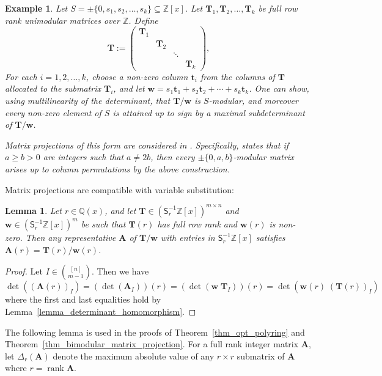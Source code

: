 \documentclass[a4paper, 11pt]{article}
\DeclareMathOperator{\rank}{rank}
\newcommand{\Z}{\mathbb{Z}}
\newcommand{\bA}{\bm{A}}
\newcommand{\bt}{\bm{t}}
\newcommand{\bw}{\bm{w}}
\newcommand{\bT}{\bm{T}}
\newcommand{\indet}{x}
\newcommand{\polyring}{\Z[\indet]}
\newcommand{\polyS}{S}
\newtheorem{lemma}{Lemma}
\newtheorem{example}{Example}
\begin{document}
\begin{example}\label{ex_trivially_S_modular}
Let $\polyS=\pm\{0,s_1,s_2,\ldots,s_k\}\subseteq\polyring$. Let $\bT_1,\bT_2,\ldots,\bT_k$ be full row rank unimodular matrices over $\Z$. Define
\[
\bT:=\left(\begin{array}{cccc}
\bT_1 &  &  &\\
 & \bT_2 & &\\
 & & \ddots &\\
 &  & & \bT_k
\end{array}\right),
\]
For each $i=1,2,\ldots,k$, choose a non-zero column $\bt_i$ from the columns of $\bT$ allocated to the submatrix $\bT_i$, and let $\bw=s_1\bt_1+s_2\bt_2+\cdots+s_k\bt_k$. One can show, using multilinearity of the determinant, that $\bT/\bw$ is $S$-modular, and moreover every non-zero element of $\polyS$ is attained up to sign by a maximal subdeterminant of $\bT/\bw$. 

Matrix projections of this form are considered in \cite{glanzer2022notes}. Specifically, \cite[Theorem~1]{glanzer2022notes} states that if $a\geq b>0$ are integers such that $a\neq2b$, then every $\pm\{0,a,b\}$-modular matrix arises up to column permutations by the above construction.
\end{example}
Matrix projections are compatible with variable substitution: 
\begin{lemma}
\label{lemma_matrix_projection_variable_substitution}
Let $r\in\mathbb{Q}(x)$, and let $\bT\in(\mathsf{S}_r^{-1}\polyring)^{m\times n}$ and $\bw\in(\mathsf{S}_r^{-1}\polyring)^m$ be such that $\bT(r)$ has full row rank and $\bw(r)$ is non-zero. Then any representative $\bA$ of $\bT/\bw$ with entries in $\mathsf{S}_r^{-1}\polyring$ satisfies $\bA(r)=\bT(r)/\bw(r)$.
\end{lemma}
\begin{proof}
Let $I\in\binom{[n]}{m-1}$. Then we have
\[
\det((\bA(r))_I)=(\det(\bA_I))(r)=(\det(\bw\;\bT_I))(r)=\det(\bw(r)\;(\bT(r))_I)
\]
where the first and last equalities hold by Lemma~\ref{lemma_determinant_homomorphism}.
\end{proof}

The following lemma is used in the proofs of Theorem~\ref{thm_opt_polyring} and Theorem~\ref{thm_bimodular_matrix_projection}. For a full rank integer matrix $\bA$, let $\Delta_r(\bA)$ denote the maximum absolute value of any $r\times r$ submatrix of $\bA$ where $r=\rank \bA$.
\end{document}
